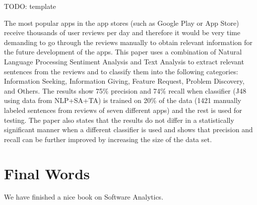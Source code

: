 \documentclass[]{book}
\begin{document}
TODO: template

The most popular apps in the app stores (such as Google Play or App
Store) receive thousands of user reviews per day and therefore it would
be very time demanding to go through the reviews manually to obtain
relevant information for the future development of the apps. This paper
uses a combination of Natural Language Processing Sentiment Analysis and
Text Analysis to extract relevant sentences from the reviews and to
classify them into the following categories: Information Seeking,
Information Giving, Feature Request, Problem Discovery, and Others. The
results show 75\% precision and 74\% recall when classifier (J48 using
data from NLP+SA+TA) is trained on 20\% of the data (1421 manually
labeled sentences from reviews of seven different apps) and the rest is
used for testing. The paper also states that the results do not differ
in a statistically significant manner when a different classifier is
used and shows that precision and recall can be further improved by
increasing the size of the data set.

\chapter{Final Words}\label{final-words}

We have finished a nice book on Software Analytics.


\end{document}
